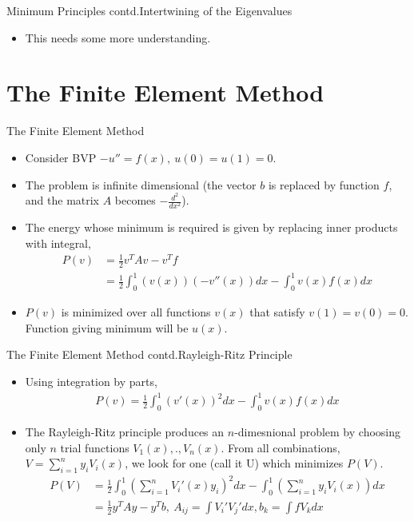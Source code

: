 \documentclass{beamer}
\begin{document}
\begin{frame}{Minimum Principles contd.}{Intertwining of the Eigenvalues}
\begin{itemize}
    \item This needs some more understanding.
\end{itemize}
\end{frame}


\section{The Finite Element Method}
\begin{frame}{The Finite Element Method}
\begin{itemize}
    \item {
        Consider BVP $-u'' = f(x),\ u(0) = u(1) = 0$.
    }
    \item {
        The problem is infinite dimensional (the vector $b$ is replaced by function $f$, and the matrix $A$ becomes $-\frac{d^2}{dx^2}$).
    }
    \item {
        The energy whose minimum is required is given by replacing inner products with integral,
        \begin{align*}
            P(v) &= \frac{1}{2}v^TAv - v^Tf\\
            &= \frac{1}{2}\int_{0}^{1}(v(x))(-v''(x))dx - \int_{0}^{1}v(x)f(x)dx
        \end{align*}
    }
    \item {
        $P(v)$ is minimized over all functions $v(x)$ that satisfy $v(1) = v(0) = 0$. Function giving minimum will be $u(x)$.
    }
\end{itemize}
\end{frame}

\begin{frame}{The Finite Element Method contd.}{Rayleigh-Ritz Principle}
\begin{itemize}
    \item {
        Using integration by parts,
        \begin{align*}
            P(v) = \frac{1}{2}\int_{0}^{1}(v'(x))^2dx - \int_{0}^{1}v(x)f(x)dx
        \end{align*}
    }
    \item The Rayleigh-Ritz principle produces an $n$-dimesnional problem by choosing only $n$ trial functions $V_1(x),.,V_n(x)$. From all combinations, $V = \sum_{i=1}^{n}y_i V_i(x)$, we look for one (call it U) which minimizes $P(V)$.
    \begin{align*}
        P(V) &= \frac{1}{2}\int_{0}^{1}\left(\sum_{i=1}^{n}V_i'(x)y_i\right)^2dx - \int_{0}^{1}\left(\sum_{i=1}^{n}y_iV_i(x)\right)dx\\
        &= \frac{1}{2}y^TAy - y^Tb, \ A_{ij} = \int V_i'V_j'dx, b_k = \int fV_kdx
    \end{align*}
\end{itemize}
\end{frame}
\end{document}
